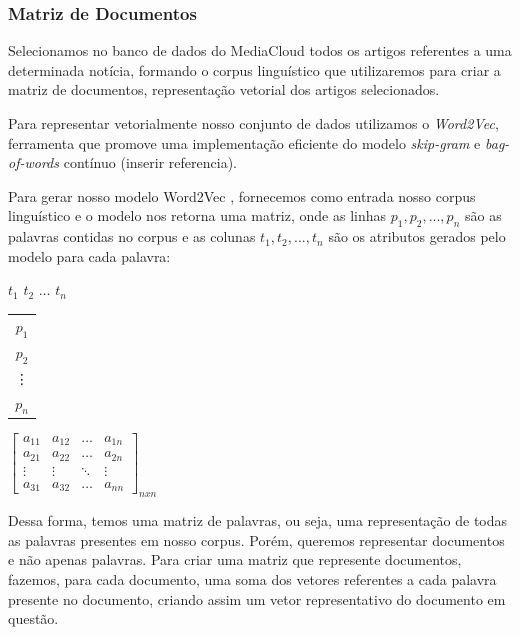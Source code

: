 \documentclass[a4paper,12pt]{article}
\begin{document}
\pagebreak
\subsubsection{Matriz de Documentos}

Selecionamos no banco de dados do MediaCloud todos os artigos referentes a uma determinada notícia, formando o corpus linguístico que 
utilizaremos para criar a matriz de documentos, representação vetorial dos artigos selecionados.

Para representar vetorialmente nosso conjunto de dados utilizamos o \textit{Word2Vec}, ferramenta que promove uma implementação 
eficiente do modelo \textit{skip-gram} e \textit{bag-of-words} contínuo (inserir referencia).

Para gerar nosso modelo Word2Vec , fornecemos como entrada nosso corpus linguístico
e o modelo nos retorna uma matriz, onde as linhas $p_{1},p_{2},...,p_{n}$ são as palavras contidas no corpus e as colunas $t_{1},t_{2},...,t_{n}$
são os atributos gerados pelo modelo para cada palavra:
 
 \begin{center}
 \hspace{0.2cm}$t_{1}$ \hspace{0.5cm} $t_{2}$ \hspace{0.3cm} $\hdots$ \hspace{0.4cm}$t_{n}$
 
 \vspace{0.2cm}
 
\begin{tabular}{c}
   $p_{1}$ \\
   $p_{2}$ \\
   \vdots\\
   $p_{n}$
 \end{tabular}
 $
 \begin{bmatrix}
  a_{11} & a_{12} & \hdots & a_{1n}\\
  a_{21} & a_{22} & \hdots & a_{2n}\\
  \vdots & \vdots & \ddots & \vdots\\
  a_{31} & a_{32} & \hdots & a_{nn}
 \end{bmatrix}_{nxn}
$

\end{center}

Dessa forma, temos uma matriz de palavras, ou seja, uma representação de todas as palavras presentes em nosso corpus.
Porém, queremos representar documentos e não apenas palavras.
Para criar uma matriz que represente documentos, fazemos, para cada documento, uma soma dos vetores referentes a cada palavra presente
no documento, criando assim um vetor representativo do documento em questão.
\end{document}
